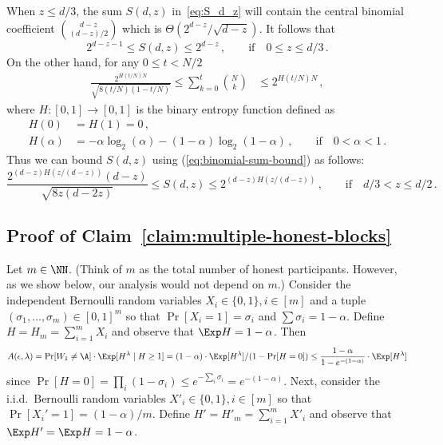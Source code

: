 
When $z \leq d/3$, the sum $S(d,z)$ in~\eqref{eq:S_d_z} 
will contain the central binomial coefficient ${d-z \choose (d-z)/2}$ which is $\Theta(2^{d-z}/\sqrt{d-z})$. 
It follows that 
\begin{equation} \label{eq:S_d_z_small}
    2^{d-z-1} 
    \leq 
    S(d,z)
    \leq 2^{d-z}\,, 
    \qquad \text{if}\quad 0 \leq z \leq d/3 
    \,.
\end{equation}
On the other hand, for any $0 \leq t < N/2$
\begin{align}\label{eq:binomial-sum-bound}
\frac{2^{H(t/N)N} }{\sqrt{8 (t/N) (1-t/N)} }
\leq 
\sum_{k=0}^t{ {N \choose k} } 
&\leq 
2^{H(t/N)N} \, , 
\end{align}
where $H : [0, 1] \rightarrow [0, 1]$ is the binary entropy function defined as
\begin{align*}
    H(0) &= H(1) = 0\, , \\
    H(\alpha) &= -\alpha \log_2(\alpha) - (1-\alpha) \log_2(1-\alpha)\,, 
        \qquad \text{if}\quad 0 < \alpha < 1\, .
\end{align*}
Thus we can bound $S(d,z)$ using (\ref{eq:binomial-sum-bound}) as follows:
\begin{equation} \label{eq:S_d_z_large}
    \frac{2^{(d-z)H(z/(d-z))}(d-z)}{\sqrt{8 z(d-2z) }}
    \leq
    S(d, z) 
    \leq
    2^{(d-z)H(z/(d-z))}
    \,,\qquad \text{if} \quad d/3 < z \leq d/2 
    \,.
\end{equation}



\subsection{Proof of Claim~\ref{claim:multiple-honest-blocks}}

  Let $m \in \NN$. 
  (Think of $m$ as the total number of honest participants. 
  However, as we show below, our analysis would not depend on $m$.)
  Consider the independent Bernoulli random variables $X_i \in \{0, 1\}, i \in [m]$ 
  and a tuple $(\sigma_1, \ldots, \sigma_m) \in [0,1]^m$ 
  so that $\Pr[X_i = 1] = \sigma_i$ 
  and $\sum \sigma_i = 1 - \alpha$. 
  Define $H = H_m = \sum_{i =1}^m X_i$ and observe that $\Exp H = 1 - \alpha$. 
  Then 
  $$
    A(\epsilon, \lambda) 
    = \Pr[W_1 \neq \A] \cdot \Exp[H^\lambda \mid H \geq 1]
    = (1-\alpha) \cdot \Exp[H^\lambda]/(1 - \Pr[H = 0])
    \leq \frac{1 - \alpha}{1 - e^{-(1 - \alpha)}} \cdot \Exp[H^\lambda]
  $$ 
  since $\Pr[H = 0] = \prod_i (1 - \sigma_i) \leq e^{-\sum_i \sigma_i} = e^{-(1 - \alpha)}$.
  Next, consider the i.i.d.\ Bernoulli random variables $X'_i \in \{0, 1\}, i \in [m]$ 
  so that $\Pr[X_i' = 1] = (1-\alpha)/m$. 
  Define $H' = H'_m = \sum_{i =1}^m X'_i$ and observe that $\Exp H' = \Exp H = 1 - \alpha$. 


